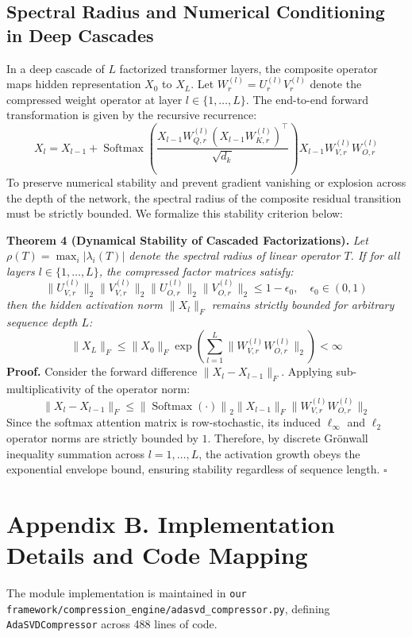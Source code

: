 \documentclass{article}
\begin{document}
\subsection*{Spectral Radius and Numerical Conditioning in Deep Cascades}
In a deep cascade of $L$ factorized transformer layers, the composite operator maps hidden representation $X_0$ to $X_L$. Let $W^{(l)}_r = U^{(l)}_r V^{(l)}_r$ denote the compressed weight operator at layer $l \in \{1, \dots, L\}$. The end-to-end forward transformation is given by the recursive recurrence:
\[
X_l = X_{l-1} + \operatorname{Softmax}\left( \frac{X_{l-1} W^{(l)}_{Q, r} (X_{l-1} W^{(l)}_{K, r})^\top}{\sqrt{d_k}} \right) X_{l-1} W^{(l)}_{V, r} W^{(l)}_{O, r}
\]
To preserve numerical stability and prevent gradient vanishing or explosion across the depth of the network, the spectral radius of the composite residual transition must be strictly bounded. We formalize this stability criterion below:

\textbf{Theorem 4 (Dynamical Stability of Cascaded Factorizations).} \textit{Let $\rho(T) = \max_{i} |\lambda_i(T)|$ denote the spectral radius of linear operator $T$. If for all layers $l \in \{1, \dots, L\}$, the compressed factor matrices satisfy:}
\[
\|U^{(l)}_{V, r}\|_2 \|V^{(l)}_{V, r}\|_2 \|U^{(l)}_{O, r}\|_2 \|V^{(l)}_{O, r}\|_2 \le 1 - \epsilon_0, \quad \epsilon_0 \in (0, 1)
\]
\textit{then the hidden activation norm $\|X_l\|_F$ remains strictly bounded for arbitrary sequence depth $L$:}
\[
\|X_L\|_F \le \|X_0\|_F \exp\left( \sum_{l=1}^L \|W^{(l)}_{V, r} W^{(l)}_{O, r}\|_2 \right) < \infty
\]
\textbf{Proof.} Consider the forward difference $\|X_l - X_{l-1}\|_F$. Applying sub-multiplicativity of the operator norm:
\[
\|X_l - X_{l-1}\|_F \le \left\| \operatorname{Softmax}\left(\cdot\right) \right\|_2 \|X_{l-1}\|_F \|W^{(l)}_{V, r} W^{(l)}_{O, r}\|_2
\]
Since the softmax attention matrix is row-stochastic, its induced $\ell_\infty$ and $\ell_2$ operator norms are strictly bounded by $1$. Therefore, by discrete Gr\"onwall inequality summation across $l = 1, \dots, L$, the activation growth obeys the exponential envelope bound, ensuring stability regardless of sequence length. $\square$


\section*{Appendix B. Implementation Details and Code Mapping}
The module implementation is maintained in \texttt{our framework/compression\_engine/adasvd\_compressor.py}, defining \texttt{AdaSVDCompressor} across 488 lines of code.
\end{document}
